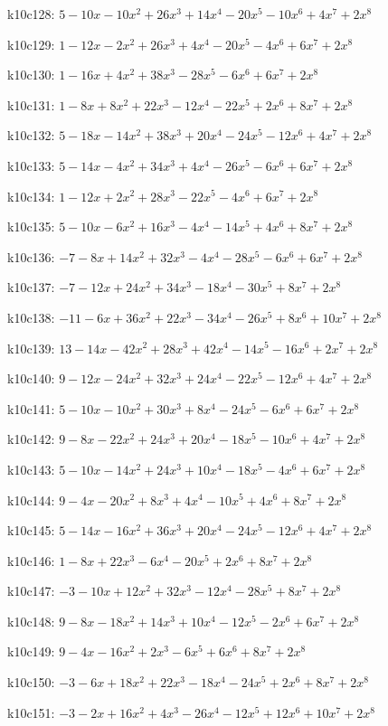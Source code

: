 k10c128: $ 5-10x-10x^{2}+26x^{3}+14x^{4}-20x^{5}-10x^{6}+4x^{7}+2x^{8} $ 

k10c129: $ 1-12x-2x^{2}+26x^{3}+4x^{4}-20x^{5}-4x^{6}+6x^{7}+2x^{8} $ 

k10c130: $ 1-16x+4x^{2}+38x^{3}-28x^{5}-6x^{6}+6x^{7}+2x^{8} $ 

k10c131: $ 1-8x+8x^{2}+22x^{3}-12x^{4}-22x^{5}+2x^{6}+8x^{7}+2x^{8} $ 

k10c132: $ 5-18x-14x^{2}+38x^{3}+20x^{4}-24x^{5}-12x^{6}+4x^{7}+2x^{8} $ 

k10c133: $ 5-14x-4x^{2}+34x^{3}+4x^{4}-26x^{5}-6x^{6}+6x^{7}+2x^{8} $ 

k10c134: $ 1-12x+2x^{2}+28x^{3}-22x^{5}-4x^{6}+6x^{7}+2x^{8} $ 

k10c135: $ 5-10x-6x^{2}+16x^{3}-4x^{4}-14x^{5}+4x^{6}+8x^{7}+2x^{8} $ 

k10c136: $ -7-8x+14x^{2}+32x^{3}-4x^{4}-28x^{5}-6x^{6}+6x^{7}+2x^{8} $ 

k10c137: $ -7-12x+24x^{2}+34x^{3}-18x^{4}-30x^{5}+8x^{7}+2x^{8} $ 

k10c138: $ -11-6x+36x^{2}+22x^{3}-34x^{4}-26x^{5}+8x^{6}+10x^{7}+2x^{8} $ 

k10c139: $ 13-14x-42x^{2}+28x^{3}+42x^{4}-14x^{5}-16x^{6}+2x^{7}+2x^{8} $ 

k10c140: $ 9-12x-24x^{2}+32x^{3}+24x^{4}-22x^{5}-12x^{6}+4x^{7}+2x^{8} $ 

k10c141: $ 5-10x-10x^{2}+30x^{3}+8x^{4}-24x^{5}-6x^{6}+6x^{7}+2x^{8} $ 

k10c142: $ 9-8x-22x^{2}+24x^{3}+20x^{4}-18x^{5}-10x^{6}+4x^{7}+2x^{8} $ 

k10c143: $ 5-10x-14x^{2}+24x^{3}+10x^{4}-18x^{5}-4x^{6}+6x^{7}+2x^{8} $ 

k10c144: $ 9-4x-20x^{2}+8x^{3}+4x^{4}-10x^{5}+4x^{6}+8x^{7}+2x^{8} $ 

k10c145: $ 5-14x-16x^{2}+36x^{3}+20x^{4}-24x^{5}-12x^{6}+4x^{7}+2x^{8} $ 

k10c146: $ 1-8x+22x^{3}-6x^{4}-20x^{5}+2x^{6}+8x^{7}+2x^{8} $ 

k10c147: $ -3-10x+12x^{2}+32x^{3}-12x^{4}-28x^{5}+8x^{7}+2x^{8} $ 

k10c148: $ 9-8x-18x^{2}+14x^{3}+10x^{4}-12x^{5}-2x^{6}+6x^{7}+2x^{8} $ 

k10c149: $ 9-4x-16x^{2}+2x^{3}-6x^{5}+6x^{6}+8x^{7}+2x^{8} $ 

k10c150: $ -3-6x+18x^{2}+22x^{3}-18x^{4}-24x^{5}+2x^{6}+8x^{7}+2x^{8} $ 

k10c151: $ -3-2x+16x^{2}+4x^{3}-26x^{4}-12x^{5}+12x^{6}+10x^{7}+2x^{8} $ 

